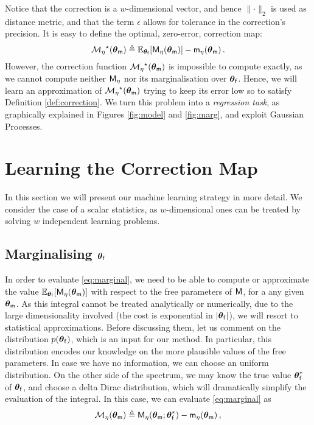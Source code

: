\documentclass[runningheads,a4paper]{llncs}
\newcommand{\bM}{{\sf{M}}}
\newcommand{\bm}{{\sf{m}}}
\newcommand{\pfpar}{\bth_{\sf{f}}}
\newcommand{\pmpar}{\bth_{\sf{m}}}
\newcommand{\tstat}{\eta} %
\newcommand{\tmap}{{{\cal M}_\tstat}}
\newcommand{\bth}{\boldsymbol{\theta}}
\begin{document}
Notice that the correction is a $w$-dimensional vector, and hence $\parallel \cdot \parallel_2$ is used as  distance metric, and that  the  term $\epsilon$ allows for tolerance in the correction's precision. It is easy to define the optimal, zero-error, correction map:
\begin{equation}\label{eq:marginal}
\tmap^\star(\bth_{\bm}) \triangleq 
\mathbb{E}_{\pfpar}[\bM_{\tstat}(\pmpar)]  - \bm_{\tstat}(\bth_{\bm}) \, .
\end{equation}
However, the correction function $\tmap^\star(\bth_{\bm})$ is impossible to compute exactly, as we cannot compute neither $\bM_{\tstat}$ nor its marginalisation over $\pfpar$. Hence, we will learn an approximation of $\tmap^\star(\bth_{\bm})$ trying to keep its error low so to satisfy Definition \ref{def:correction}.  We turn this problem into a {\em regression task}, as graphically explained in Figures \ref{fig:model} and  \ref{fig:marg}, and exploit Gaussian Processes.

\section{Learning the Correction Map}\label{sec:solution}
In this section we will present our machine learning strategy in more detail.  We consider the case of a scalar statistics, as $w$-dimensional ones can be treated by solving $w$ independent learning problems. 

\subsection{Marginalising $\pfpar$}
In order to evaluate \eqref{eq:marginal}, we need to be able to compute or approximate the value $\mathbb{E}_{\pfpar}[\bM_{\tstat}(\pmpar)]$ with respect to the free parameters of $\bM$, for a any given  $\pmpar$.  As this integral cannot be treated analytically or numerically, due to the large dimensionality involved (the cost is exponential in $|\pfpar|$), we will resort to statistical approximations. 
Before discussing them, let us comment on the distribution $p(\pfpar)$, which is an input for our method. In particular, this distribution encodes our knowledge on the more plausible values of the free parameters. In case we have no information, we can choose an uniform distribution. On the other side of the spectrum, we may know the true value $\pfpar^*$ of $\pfpar$, and choose a delta Dirac distribution, which will dramatically simplify the evaluation of the integral. In this case, we can evaluate \eqref{eq:marginal} as
\begin{equation}\label{eq:constant}
\tmap(\bth_{\bm}) \triangleq 
\bM_{\tstat}(\bth_{\bm}; \pfpar^*) - \bm_{\tstat}(\bth_{\bm}) \, ,
\end{equation}
\end{document}
